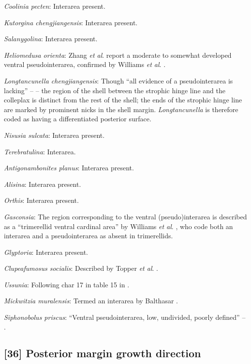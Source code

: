\documentclass[openany]{book}
\theoremstyle{definition}
\theoremstyle{definition}
\theoremstyle{definition}
\theoremstyle{remark}
\begin{document}
\emph{Coolinia pecten}: Interarea present.

\emph{Kutorgina chengjiangensis}: Interarea present.

\emph{Salanygolina}: Interarea present.

\emph{Heliomedusa orienta}: Zhang \emph{et al}.
\citeyearpar{Zhang2009Architectureand} report a moderate to somewhat
developed ventral pseudointerarea, confirmed by Williams \emph{et al}.
\citeyearpar{Williams2007PartH}.

\emph{Longtancunella chengjiangensis}: Though ``all evidence of a
pseudointerarea is lacking'' -- \citet{Zhang2011Theexceptionally} -- the
region of the shell between the strophic hinge line and the colleplax
\citep[fig. 2 in][]{Zhang2011Theexceptionally} is distinct from the rest
of the shell; the ends of the strophic hinge line are marked by
prominent nicks in the shell margin. \emph{Longtancunella} is therefore
coded as having a differentiated posterior surface.

\emph{Nisusia sulcata}: Interarea present.

\emph{Terebratulina}: Interarea.

\emph{Antigonambonites planus}: Interarea present.

\emph{Alisina}: Interarea present.

\emph{Orthis}: Interarea present.

\emph{Gasconsia}: The region corresponding to the ventral
(pseudo)interarea is described as a ``trimerellid ventral cardinal
area'' by Williams \emph{et al}.
\citeyearpar[p.162]{Williams2000BrachiopodaLinguliformea}, who code both
an interarea and a pseudointerarea as absent in trimerellids.

\emph{Glyptoria}: Interarea present.

\emph{Clupeafumosus socialis}: Described by Topper \emph{et al}.
\citeyearpar{Topper2013Reappraisalof}.

\emph{Ussunia}: Following char 17 in table 15 in
\citet{Williams2000BrachiopodaLinguliformea}.

\emph{Mickwitzia muralensis}: Termed an interarea by Balthasar
\citeyearpar{Balthasar2004Shellstructure}.

\emph{Siphonobolus priscus}: ``Ventral pseudointerarea, low, undivided,
poorly defined'' -- \citet{Williams2000BrachiopodaLinguliformea}.

\hypertarget{posterior-margin-growth-direction}{%
\subsection*{{[}36{]} Posterior margin growth
direction}\label{posterior-margin-growth-direction}}
\end{document}

